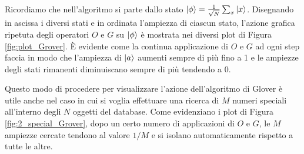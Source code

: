 Ricordiamo che nell'algoritmo si parte dallo stato $\ket{\phi} = \frac{1}{\sqrt{N}} \sum_x \ket{x}$. Disegnando in ascissa i diversi stati e in ordinata l'ampiezza di ciascun stato, l'azione grafica ripetuta degli operatori $O$ e $G$ su $\ket{\phi}$ è mostrata nei diversi plot di Figura \ref{fig:plot_Grover}. È evidente come la continua applicazione di $O$ e $G$ ad ogni step faccia in modo che l'ampiezza di $\ket{a}$ aumenti sempre di più fino a 1 e le ampiezze degli stati rimanenti diminuiscano sempre di più tendendo a 0. 

\noindent Questo modo di procedere per visualizzare l'azione dell'algoritmo di Glover è utile anche nel caso in cui si voglia effettuare una ricerca di $M$ numeri speciali all'interno degli $N$ oggetti del database. Come evidenziano i plot di Figura \ref{fig:2_special_Grover}, dopo un certo numero di applicazioni di $O$ e $G$, le $M$ ampiezze cercate tendono al valore $1/M$ e si isolano automaticamente rispetto a tutte le altre.

